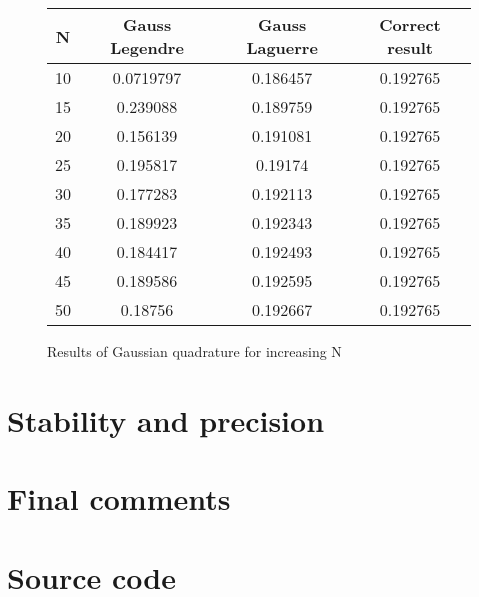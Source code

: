 \documentclass[a4paper,english, 10pt, twoside]{article}
\begin{document}
\begin{figure}[H]
\centering 
\begin{tabular}{|c|c|c|c|}
\hline
N &Gauss Legendre &Gauss Laguerre & Correct result \\
\hline
10 & 0.0719797 & 0.186457 &0.192765  \\
15 & 0.239088 & 0.189759 & 0.192765  \\
20 & 0.156139 & 0.191081 & 0.192765  \\
25 & 0.195817 & 0.19174 &0.192765  \\
30 & 0.177283 &0.192113& 0.192765  \\
35 & 0.189923 & 0.192343& 0.192765  \\
40 & 0.184417 & 0.192493 &0.192765 \\
45 & 0.189586 &0.192595 &0.192765  \\
50 & 0.18756  & 0.192667 &0.192765 \\
\hline
\end{tabular}
\caption{Results of Gaussian quadrature for increasing N}
\end{figure}


\section*{Stability and precision}
\section*{Final comments}
\section*{Source code}
\end{document}
